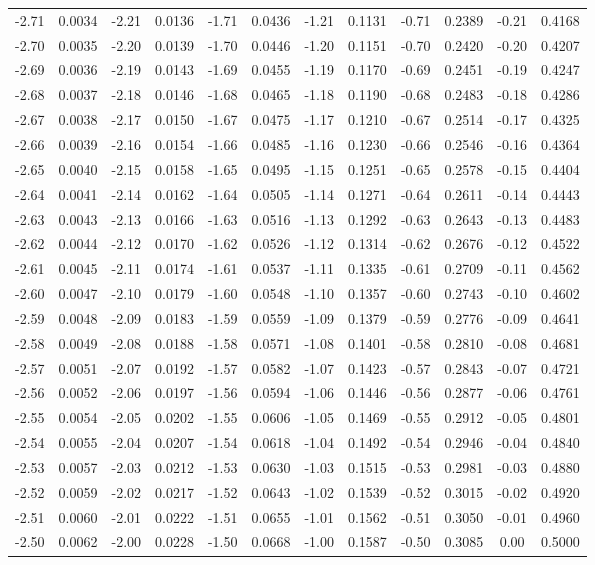 \documentclass[12pt,letterpaper]{article}
\begin{document}
\begin{center}
\begin{tabular}{c c | c c | c c | c c | c c | c c}
-2.71 & 0.0034 & -2.21 & 0.0136 & -1.71 & 0.0436 & -1.21 & 0.1131 & -0.71 & 0.2389 & -0.21 & 0.4168 \\
-2.70 & 0.0035 & -2.20 & 0.0139 & -1.70 & 0.0446 & -1.20 & 0.1151 & -0.70 & 0.2420 & -0.20 & 0.4207 \\
-2.69 & 0.0036 & -2.19 & 0.0143 & -1.69 & 0.0455 & -1.19 & 0.1170 & -0.69 & 0.2451 & -0.19 & 0.4247 \\
-2.68 & 0.0037 & -2.18 & 0.0146 & -1.68 & 0.0465 & -1.18 & 0.1190 & -0.68 & 0.2483 & -0.18 & 0.4286 \\
-2.67 & 0.0038 & -2.17 & 0.0150 & -1.67 & 0.0475 & -1.17 & 0.1210 & -0.67 & 0.2514 & -0.17 & 0.4325 \\
-2.66 & 0.0039 & -2.16 & 0.0154 & -1.66 & 0.0485 & -1.16 & 0.1230 & -0.66 & 0.2546 & -0.16 & 0.4364 \\
-2.65 & 0.0040 & -2.15 & 0.0158 & -1.65 & 0.0495 & -1.15 & 0.1251 & -0.65 & 0.2578 & -0.15 & 0.4404 \\
-2.64 & 0.0041 & -2.14 & 0.0162 & -1.64 & 0.0505 & -1.14 & 0.1271 & -0.64 & 0.2611 & -0.14 & 0.4443 \\
-2.63 & 0.0043 & -2.13 & 0.0166 & -1.63 & 0.0516 & -1.13 & 0.1292 & -0.63 & 0.2643 & -0.13 & 0.4483 \\
-2.62 & 0.0044 & -2.12 & 0.0170 & -1.62 & 0.0526 & -1.12 & 0.1314 & -0.62 & 0.2676 & -0.12 & 0.4522 \\
-2.61 & 0.0045 & -2.11 & 0.0174 & -1.61 & 0.0537 & -1.11 & 0.1335 & -0.61 & 0.2709 & -0.11 & 0.4562 \\
-2.60 & 0.0047 & -2.10 & 0.0179 & -1.60 & 0.0548 & -1.10 & 0.1357 & -0.60 & 0.2743 & -0.10 & 0.4602 \\
-2.59 & 0.0048 & -2.09 & 0.0183 & -1.59 & 0.0559 & -1.09 & 0.1379 & -0.59 & 0.2776 & -0.09 & 0.4641 \\
-2.58 & 0.0049 & -2.08 & 0.0188 & -1.58 & 0.0571 & -1.08 & 0.1401 & -0.58 & 0.2810 & -0.08 & 0.4681 \\
-2.57 & 0.0051 & -2.07 & 0.0192 & -1.57 & 0.0582 & -1.07 & 0.1423 & -0.57 & 0.2843 & -0.07 & 0.4721 \\
-2.56 & 0.0052 & -2.06 & 0.0197 & -1.56 & 0.0594 & -1.06 & 0.1446 & -0.56 & 0.2877 & -0.06 & 0.4761 \\
-2.55 & 0.0054 & -2.05 & 0.0202 & -1.55 & 0.0606 & -1.05 & 0.1469 & -0.55 & 0.2912 & -0.05 & 0.4801 \\
-2.54 & 0.0055 & -2.04 & 0.0207 & -1.54 & 0.0618 & -1.04 & 0.1492 & -0.54 & 0.2946 & -0.04 & 0.4840 \\
-2.53 & 0.0057 & -2.03 & 0.0212 & -1.53 & 0.0630 & -1.03 & 0.1515 & -0.53 & 0.2981 & -0.03 & 0.4880 \\
-2.52 & 0.0059 & -2.02 & 0.0217 & -1.52 & 0.0643 & -1.02 & 0.1539 & -0.52 & 0.3015 & -0.02 & 0.4920 \\
-2.51 & 0.0060 & -2.01 & 0.0222 & -1.51 & 0.0655 & -1.01 & 0.1562 & -0.51 & 0.3050 & -0.01 & 0.4960 \\
-2.50 & 0.0062 & -2.00 & 0.0228 & -1.50 & 0.0668 & -1.00 & 0.1587 & -0.50 & 0.3085 & 0.00 & 0.5000 
\end{tabular}
\end{center}
\end{document}
